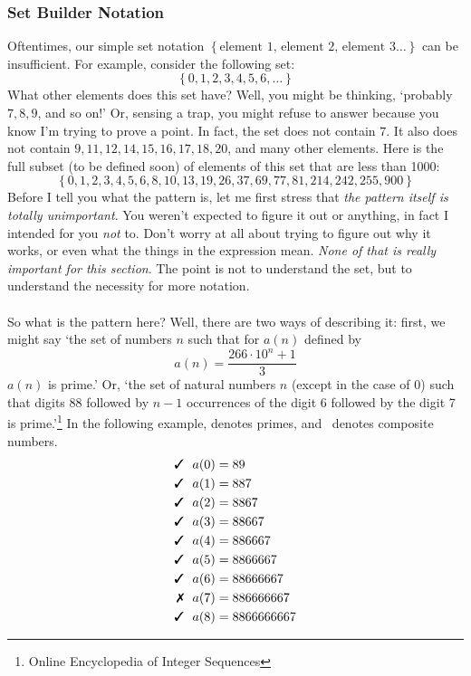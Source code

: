 \documentclass[10pt]{article}
\newcommand{\cmark}{\ding{51}}%
\newcommand{\xmark}{\ding{55}}
\theoremstyle{definition}
\newcommand{\set}[1]{\left\{ #1 \right\}}
\begin{document}
{\subsubsection{Set Builder Notation}
Oftentimes, our simple set notation $\set{\text{element 1, element 2,
    element 3}\dots}$ can be insufficient.  For example, consider the
following set:
\[\set{0,1,2,3,4,5,6,\ldots}\]
What other elements does this set have?  Well, you might be thinking,
`probably $7,8,9$, and so on!'  Or, sensing a trap, you might refuse
to answer because you know I'm trying to prove a point.  In fact, the
set does not contain $7$.  It also does not contain
$9,11,12,14,15,16,17,18,20$, and many other elements.  Here is the
full subset (to be defined soon) of elements of this set that are less
than 1000:
\[\set{0,1,2,3,4,5,6,8,10,13,19,26,37,69,77,81,214,242,255,900}\]
Before I tell you what the pattern is, let me first stress that
\emph{the pattern itself is totally unimportant}.  You weren't
expected to figure it out or anything, in fact I intended for you
\emph{not} to.  Don't worry at all about trying to figure out why it
works, or even what the things in the expression mean.  \emph{None of
  that is really important for this section}.  The point is not to
understand the set, but to understand the necessity for more notation.
\\~\\
So what is the pattern here?  Well, there are two ways of describing
it: first, we might say `the set of numbers $n$ such that for $a(n)$
defined by
\[a(n) = \frac{266\cdot 10^{n}+1}{3}\]
$a(n)$ is prime.'  Or, `the set of natural numbers $n$ (except in the
case of 0) such that digits 88 followed by $n-1$ occurrences of the
digit 6 followed by the digit 7 is prime.'\footnote{Online
  Encyclopedia of Integer Sequences}  In the following example, \cmark
denotes primes, and \xmark ~denotes composite numbers.
\begin{align*}
\text{\cmark~~}a(0) &= 89 \\
\text{\cmark~~}a(1) &= 887 \\
\text{\cmark~~}a(2) &= 8867 \\
\text{\cmark~~}a(3) &= 88667 \\
\text{\cmark~~}a(4) &= 886667 \\
\text{\cmark~~}a(5) &= 8866667 \\
\text{\cmark~~}a(6) &= 88666667 \\
\text{\xmark~~}a(7) &= 886666667 \\
\text{\cmark~~}a(8) &= 8866666667 \\

\end{align*}}
\end{document}
